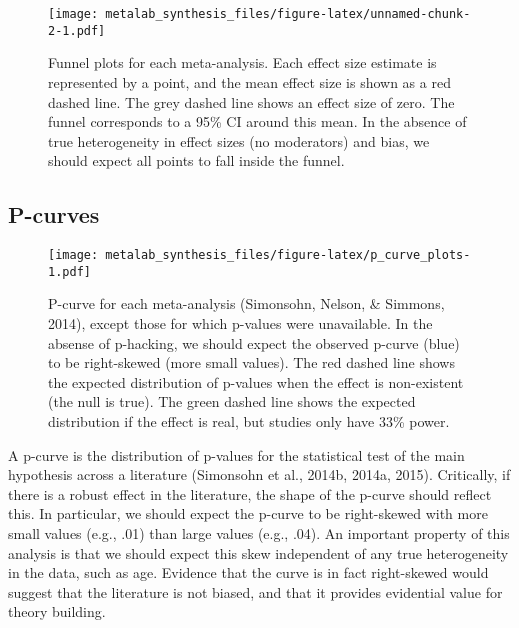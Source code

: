 \documentclass[english,floatsintext,man]{apa6}
\begin{document}
\begin{figure}[htbp]
\centering
\texttt{[image: metalab\_synthesis\_files/figure-latex/unnamed-chunk-2-1.pdf]}
\caption{Funnel plots for each meta-analysis. Each effect size estimate
is represented by a point, and the mean effect size is shown as a red
dashed line. The grey dashed line shows an effect size of zero. The
funnel corresponds to a 95\% CI around this mean. In the absence of true
heterogeneity in effect sizes (no moderators) and bias, we should expect
all points to fall inside the funnel.}
\end{figure}

\subsection{P-curves}\label{p-curves}

\begin{figure}[htbp]
\centering
\texttt{[image: metalab\_synthesis\_files/figure-latex/p\_curve\_plots-1.pdf]}
\caption{P-curve for each meta-analysis (Simonsohn, Nelson, \& Simmons,
2014), except those for which p-values were unavailable. In the absense
of p-hacking, we should expect the observed p-curve (blue) to be
right-skewed (more small values). The red dashed line shows the expected
distribution of p-values when the effect is non-existent (the null is
true). The green dashed line shows the expected distribution if the
effect is real, but studies only have 33\% power.}
\end{figure}

A p-curve is the distribution of p-values for the statistical test of
the main hypothesis across a literature (Simonsohn et al., 2014b, 2014a,
2015). Critically, if there is a robust effect in the literature, the
shape of the p-curve should reflect this. In particular, we should
expect the p-curve to be right-skewed with more small values (e.g., .01)
than large values (e.g., .04). An important property of this analysis is
that we should expect this skew independent of any true heterogeneity in
the data, such as age. Evidence that the curve is in fact right-skewed
would suggest that the literature is not biased, and that it provides
evidential value for theory building.
\end{document}
